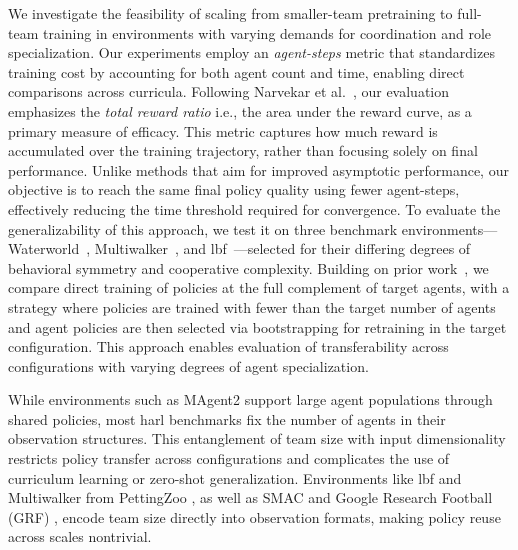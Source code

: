We investigate the feasibility of scaling from smaller-team pretraining to full-team 
training in environments with varying demands for coordination and role specialization.
Our experiments employ an \emph{agent-steps} metric that standardizes training cost by 
accounting for both agent count and time, enabling direct comparisons across curricula. 
Following Narvekar et al.~\cite{narvekar2020}, our evaluation emphasizes the 
\textit{total reward ratio} i.e., the area under the reward curve, as a primary 
measure of efficacy. This metric captures how much reward is accumulated 
over the training trajectory, rather than focusing solely on final performance. 
Unlike methods that aim for improved asymptotic performance, 
our objective is to reach the same final policy quality using fewer agent-steps, 
effectively reducing the time threshold required for convergence.
To evaluate the generalizability of this approach, we test it on three benchmark 
environments—Waterworld~\cite{gupta2017}, Multiwalker~\cite{gupta2017}, 
and \gls{lbf}~\cite{papoudakis2021}—selected for their 
differing degrees of behavioral symmetry and cooperative complexity. 
Building on prior work~\cite{smit2023}, we compare 
direct training of policies at the full complement of target agents, with a strategy 
where policies are trained with fewer than the target number of agents and agent 
policies are then selected via bootstrapping for retraining in the target configuration.
This approach enables evaluation of transferability across configurations with 
varying degrees of agent specialization.

While environments such as MAgent2 \cite{zheng2017} support large agent populations through 
shared policies, most \gls{harl} benchmarks fix the number of agents in their observation structures. 
This entanglement of team size with input dimensionality restricts policy transfer across 
configurations and complicates the use of curriculum learning or zero-shot generalization. 
Environments like \gls{lbf} and Multiwalker from PettingZoo \cite{terry2021}, as well as 
SMAC \cite{samvelyan2019} and Google Research Football (GRF) \cite{kurach2020}, 
encode team size directly into observation formats, making policy reuse across scales nontrivial.


